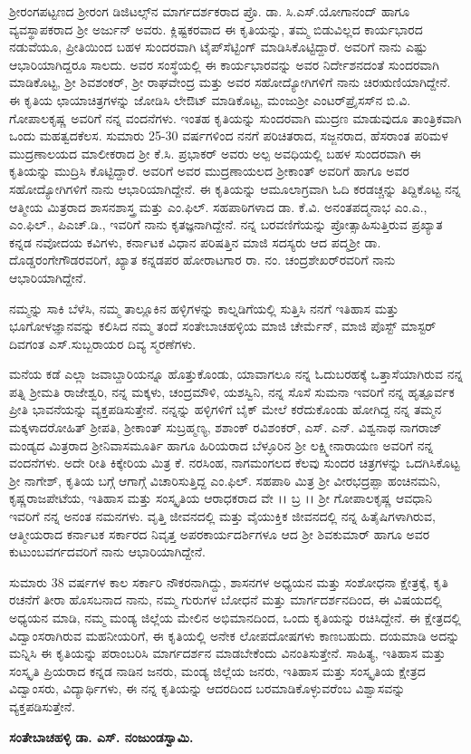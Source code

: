 ಶ್ರೀರಂಗಪಟ್ಟಣದ ಶ್ರೀರಂಗ ಡಿಜಿಟಲ್ಸ್​ನ ಮಾರ್ಗದರ್ಶಕರಾದ ಪ್ರೊ. ಡಾ. ಸಿ.ಎಸ್​.ಯೋಗಾನಂದ್​ ಹಾಗೂ ವ್ಯವಸ್ಥಾಪಕರಾದ ಶ್ರೀ ಅರ್ಜುನ್​ ಅವರು. ಕ್ಲಿಷ್ಟಕರವಾದ ಈ ಕೃತಿಯನ್ನು, ತಮ್ಮ ಬಿಡುವಿಲ್ಲದ ಕಾರ್ಯಭಾರದ ನಡುವೆಯೂ, ಪ್ರೀತಿಯಿಂದ ಬಹಳ ಸುಂದರವಾಗಿ ಟೈಪ್​ಸೆಟ್ಟಿಂಗ್​ ಮಾಡಿಸಿಕೊಟ್ಟಿದ್ದಾರೆ. ಅವರಿಗೆ ನಾನು ಎಷ್ಟು ಆಭಾರಿ\-ಯಾಗಿದ್ದರೂ ಸಾಲದು. ಅವರ ಸಂಸ್ಥೆಯಲ್ಲಿ ಈ ಕಾರ್ಯಭಾರವನ್ನು ಅವರ ನಿರ್ದೇಶನದಂತೆ ಸುಂದರವಾಗಿ ಮಾಡಿಕೊಟ್ಟ,  ಶ್ರೀ ಶಿವಶಂಕರ್​, ಶ್ರೀ ರಾಘವೇಂದ್ರ ಮತ್ತು ಅವರ ಸಹೋದ್ಯೋಗಿಗಳಿಗೆ ನಾನು ಚಿರಋಣಿಯಾಗಿದ್ದೇನೆ. ಈ ಕೃತಿಯ ಛಾಯಾಚಿತ್ರಗಳನ್ನು ಜೋಡಿಸಿ ಲೇಔಟ್​ ಮಾಡಿಕೊಟ್ಟ, ಮಂಜುಶ್ರೀ ಎಂಟರ್​\-ಪ್ರೈಸಸ್​ನ ಬಿ.ವಿ. ಗೋಪಾಲಕೃಷ್ಣ ಅವರಿಗೆ ನನ್ನ ವಂದನೆಗಳು.  ಇಂತಹ ಕೃತಿಯನ್ನು ಸುಂದರವಾಗಿ ಮುದ್ರಣ ಮಾಡುವುದೂ ತಾಂತ್ರಿಕವಾಗಿ  ಒಂದು ಮಹತ್ವದ\break ಕೆಲಸ.  ಸುಮಾರು 25{\rm -}30 ವರ್ಷಗಳಿಂದ ನನಗೆ ಪರಿಚಿತರಾದ, ಸಜ್ಜನರಾದ, ಹೆಸರಾಂತ ಪರಿಮಳ ಮುದ್ರಣಾಲಯದ ಮಾಲೀಕ\-ರಾದ ಶ್ರೀ ಕೆ.ಸಿ. ಪ್ರಭಾಕರ್​ ಅವರು ಅಲ್ಪ ಅವಧಿಯಲ್ಲಿ ಬಹಳ ಸುಂದರವಾಗಿ ಈ ಕೃತಿಯನ್ನು ಮುದ್ರಿಸಿ ಕೊಟ್ಟಿದ್ದಾರೆ. ಅವರಿಗೆ ಅವರ ಮುದ್ರಣಾಯಲದ ಶ್ರೀಕಾಂತ್​ ಅವರಿಗೆ ಹಾಗೂ ಅವರ ಸಹೋದ್ಯೋಗಿ\-ಗಳಿಗೆ ನಾನು ಆಭಾರಿಯಾಗಿದ್ದೇನೆ. ಈ ಕೃತಿಯನ್ನು ಆಮೂಲಾಗ್ರವಾಗಿ ಓದಿ ಕರಡಚ್ಚನ್ನು ತಿದ್ದಿಕೊಟ್ಟ ನನ್ನ ಆತ್ಮೀಯ ಮಿತ್ರರಾದ ಶಾಸನಶಾಸ್ತ್ರ ಮತ್ತು ಎಂ.ಫಿಲ್. ಸಹಪಾಠಿಗಳಾದ ಡಾ. ಕೆ.ವಿ. ಅನಂತಪದ್ಮನಾಭ ಎಂ.ಎ., ಎಂ.ಫಿಲ್., ಪಿಎಚ್.ಡಿ., ಇವರಿಗೆ ನಾನು ಕೃತಜ್ಞನಾಗಿದ್ದೇನೆ. ನನ್ನ ಬರವಣಿಗೆಯನ್ನು ಪ್ರೋತ್ಸಾಹಿಸುತ್ತಿರುವ ಪ್ರಖ್ಯಾತ ಕನ್ನಡ ನವೋದಯ ಕವಿಗಳು, ಕರ್ನಾಟಕ ವಿಧಾನ ಪರಿಷತ್ತಿನ ಮಾಜಿ ಸದಸ್ಯರು ಆದ ಪದ್ಮಶ್ರೀ ಡಾ. ದೊಡ್ಡರಂಗೇಗೌಡರವರಿಗೆ, ಖ್ಯಾತ ಕನ್ನಡಪರ ಹೋರಾಟಗಾರ ರಾ. ನಂ. ಚಂದ್ರಶೇಖರ್‌ರವರಿಗೆ ನಾನು ಆಭಾರಿಯಾಗಿದ್ದೇನೆ.

ನಮ್ಮನ್ನು ಸಾಕಿ ಬೆಳೆಸಿ, ನಮ್ಮ ತಾಲ್ಲೂಕಿನ ಹಳ್ಳಿಗಳನ್ನು ಕಾಲ್ನಡಿಗೆಯಲ್ಲಿ ಸುತ್ತಿಸಿ ನನಗೆ ಇತಿಹಾಸ ಮತ್ತು ಭೂಗೋಳ\break ಜ್ಞಾನವನ್ನು ಕಲಿಸಿದ ನಮ್ಮ ತಂದೆ ಸಂತೇಬಾಚಹಳ್ಳಿಯ ಮಾಜಿ ಚೇರ್ಮೆನ್, ಮಾಜಿ ಪೊಸ್ಟ್ ಮಾಸ್ಟರ್ ದಿವಗಂತ ಎಸ್.\break ಸುಬ್ಬರಾಯರ ದಿವ್ಯ ಸ್ಮರಣೆಗಳು.

ಮನೆಯ ಕಡೆ ಎಲ್ಲಾ ಜವಾಬ್ದಾರಿಯನ್ನೂ ಹೊತ್ತುಕೊಂಡು, ಯಾವಾಗಲೂ ನನ್ನ ಓದುಬರಹಕ್ಕೆ ಒತ್ತಾಸೆಯಾಗಿರುವ ನನ್ನ ಪತ್ನಿ ಶ್ರೀಮತಿ ರಾಜೇಶ್ವರಿ, ನನ್ನ ಮಕ್ಕಳು, ಚಂದ್ರಮೌಳಿ, ಯಶಸ್ವಿನಿ, ನನ್ನ ಸೊಸೆ ಸುಮನಾ ಇವರಿಗೆ ನನ್ನ ಹೃತ್ಪೂರ್ವಕ ಪ್ರೀತಿ ಭಾವನೆಯನ್ನು ವ್ಯಕ್ತಪಡಿಸುತ್ತೇನೆ. ನನ್ನನ್ನು ಹಳ್ಳಿಗಳಿಗೆ ಬೈಕ್​ ಮೇಲೆ ಕರೆದುಕೊಂಡು ಹೋಗಿದ್ದ ನನ್ನ ತಮ್ಮನ ಮಕ್ಕಳಾದ\break  ರೋಹಿತ್​ ಶ್ರೀಪತಿ, ಶ್ರೀಕಾಂತ್​ ಸುಬ್ರಹ್ಮಣ್ಯ, ಶಶಾಂಕ್ ರವಿಶಂಕರ್, ಎಸ್. ಎನ್. ವಿಶ್ವನಾಥ ನಾಗರಾಜ್ ಮಂಡ್ಯದ ಮಿತ್ರರಾದ ಶ್ರೀನಿವಾಸಮೂರ್ತಿ ಹಾಗೂ ಹಿರಿಯರಾದ ಬೆಳ್ಳೂರಿನ ಶ್ರೀ ಲಕ್ಷ್ಮೀನಾರಾಯಣ ಅವರಿಗೆ ನನ್ನ ವಂದನೆಗಳು. ಅದೇ ರೀತಿ ಕಿಕ್ಕೇರಿಯ ಮಿತ್ರ ಕೆ. ನರಸಿಂಹ, ನಾಗಮಂಗಲದ ಕೆಲವು ಸುಂದರ ಚಿತ್ರಗಳನ್ನು ಒದಗಿಸಿಕೊಟ್ಟ ಶ್ರೀ ನಾಗೇಶ್, ಕೃತಿಯ ಬಗ್ಗೆ ಆಗಾಗ್ಗೆ ವಿಚಾರಿಸುತ್ತಿದ್ದ ಎಂ.ಫಿಲ್. ಸಹಪಾಠಿ ಮಿತ್ರ ಶ್ರೀ ವೀರಭದ್ರಪ್ಪಾ ಹಂಚಿನಮನಿ, ಕೃಷ್ಣರಾಜಪೇಟೆಯ, ಇತಿಹಾಸ ಮತ್ತು ಸಂಸ್ಕೃತಿಯ ಆರಾಧಕರಾದ ವೇ ।। ಬ್ರ ।। ಶ್ರೀ ಗೋಪಾಲಕೃಷ್ಣ ಆವಧಾನಿ ಇವರಿಗೆ ನನ್ನ ಅನಂತ ನಮನಗಳು.  ವೃತ್ತಿ ಜೀವನದಲ್ಲಿ ಮತ್ತು ವೈಯುಕ್ತಿಕ ಜೀವನದಲ್ಲಿ ನನ್ನ ಹಿತೈಷಿಗಳಾಗಿರುವ, ಆತ್ಮೀಯರಾದ ಕರ್ನಾಟಕ ಸರ್ಕಾರದ ನಿವೃತ್ತ ಅಪರಕಾರ್ಯದರ್ಶಿ\-ಗಳೂ ಆದ ಶ್ರೀ ಶಿವಕುಮಾರ್ ಹಾಗೂ ಅವರ ಕುಟುಂಬವರ್ಗದವರಿಗೆ ನಾನು ಆಭಾರಿಯಾಗಿದ್ದೇನೆ.

ಸುಮಾರು 38 ವರ್ಷಗಳ ಕಾಲ ಸರ್ಕಾರಿ ನೌಕರನಾಗಿದ್ದು, ಶಾಸನಗಳ ಅಧ್ಯಯನ ಮತ್ತು ಸಂಶೋಧನಾ ಕ್ಷೇತ್ರಕ್ಕೆ, ಕೃತಿ ರಚನೆಗೆ ತೀರಾ ಹೊಸಬನಾದ ನಾನು, ನಮ್ಮ ಗುರುಗಳ ಬೋಧನೆ ಮತ್ತು ಮಾರ್ಗದರ್ಶನದಿಂದ, ಈ ವಿಷಯದಲ್ಲಿ ಅಧ್ಯಯನ ಮಾಡಿ, ನಮ್ಮ ಮಂಡ್ಯ ಜಿಲ್ಲೆಯ ಮೇಲಿನ ಅಭಿಮಾನದಿಂದ, ಒಂದು ಕೃತಿಯನ್ನು ರಚಿಸಿದ್ದೇನೆ. ಈ ಕ್ಷೇತ್ರದಲ್ಲಿ ವಿದ್ವಾಂಸ\-ರಾಗಿರುವ ಮಹನೀಯರಿಗೆ, ಈ ಕೃತಿಯಲ್ಲಿ ಅನೇಕ ಲೋಪದೋಷಗಳು ಕಾಣಬಹುದು. ದಯಮಾಡಿ ಅದನ್ನು ಮನ್ನಿಸಿ ಈ ಕೃತಿಯನ್ನು ಪರಾಂಬರಿಸಿ ಮಾರ್ಗದರ್ಶನ ಮಾಡಬೇಕೆಂದು ವಿನಂತಿಸುತ್ತೇನೆ.  ಸಾಹಿತ್ಯ, ಇತಿಹಾಸ ಮತ್ತು ಸಂಸ್ಕೃತಿ ಪ್ರಿಯರಾದ ಕನ್ನಡ ನಾಡಿನ ಜನರು,  ಮಂಡ್ಯ ಜಿಲ್ಲೆಯ ಜನರು, ಇತಿಹಾಸ ಮತ್ತು ಸಂಸ್ಕೃತಿಯ ಕ್ಷೇತ್ರದ ವಿದ್ವಾಂಸರು, ವಿದ್ಯಾರ್ಥಿಗಳು, ಈ ನನ್ನ ಕೃತಿಯನ್ನು ಆದರದಿಂದ ಬರಮಾಡಿಕೊಳ್ಳುವರೆಂಬ ವಿಶ್ವಾಸವನ್ನು ವ್ಯಕ್ತಪಡಿಸುತ್ತೇನೆ. 

\bigskip

\begin{flushright}
\textbf{ಸಂತೇಬಾಚಹಳ್ಳಿ ಡಾ. ಎಸ್​. ನಂಜುಂಡಸ್ವಾಮಿ.}
\end{flushright}


